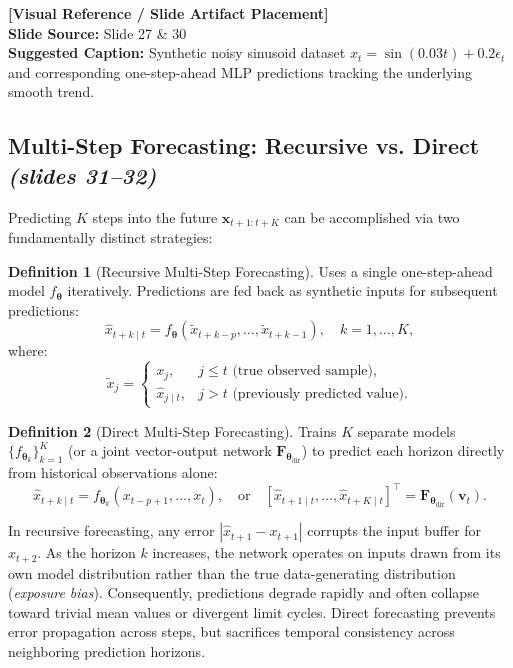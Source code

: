\documentclass[11pt,a4paper]{article}
\theoremstyle{definition}
\newtheorem{definition}{Definition}[section]
\theoremstyle{plain}
\newcommand{\slideimageplaceholder}[2]{
    \begin{center}
    \begin{tcolorbox}[
        enhanced,
        colback=gray!8!white,
        colframe=gray!60!black,
        width=0.92\textwidth,
        arc=2mm,
        frame hidden,
        borderline={0.5mm}{0mm}{gray!60!black, dashed},
        halign=center
    ]
        \vspace{0.4cm}
        \textbf{\textsf{[Visual Reference / Slide Artifact Placement]}} \\
        \vspace{0.2cm}
        \textsf{\textbf{Slide Source:} Slide #1} \\
        \textsf{\textbf{Suggested Caption:} #2}
        \vspace{0.4cm}
    \end{tcolorbox}
    \end{center}
}
\begin{document}
\slideimageplaceholder{27 \& 30}{Synthetic noisy sinusoid dataset $x_t = \sin(0.03t) + 0.2\epsilon_t$ and corresponding one-step-ahead MLP predictions tracking the underlying smooth trend.}

\subsection{Multi-Step Forecasting: Recursive vs. Direct \emph{(slides 31--32)}}
Predicting $K$ steps into the future $\mathbf{x}_{t+1:t+K}$ can be accomplished via two fundamentally distinct strategies:

\begin{definition}[Recursive Multi-Step Forecasting]
Uses a single one-step-ahead model $f_{\boldsymbol{\theta}}$ iteratively. Predictions are fed back as synthetic inputs for subsequent predictions:
\begin{equation}
    \hat{x}_{t+k \mid t} = f_{\boldsymbol{\theta}}(\tilde{x}_{t+k-p}, \dots, \tilde{x}_{t+k-1}), \quad k = 1, \dots, K,
\end{equation}
where:
\begin{equation}
    \tilde{x}_j = \begin{cases} x_j, & j \le t \text{ (true observed sample)}, \\ \hat{x}_{j \mid t}, & j > t \text{ (previously predicted value)}. \end{cases}
\end{equation}
\end{definition}

\begin{definition}[Direct Multi-Step Forecasting]
Trains $K$ separate models $\{f_{\boldsymbol{\theta}_k}\}_{k=1}^K$ (or a joint vector-output network $\mathbf{F}_{\boldsymbol{\theta}_{\text{dir}}}$) to predict each horizon directly from historical observations alone:
\begin{equation}
    \hat{x}_{t+k \mid t} = f_{\boldsymbol{\theta}_k}(x_{t-p+1}, \dots, x_t), \quad \text{or} \quad [\hat{x}_{t+1 \mid t}, \dots, \hat{x}_{t+K \mid t}]^\top = \mathbf{F}_{\boldsymbol{\theta}_{\text{dir}}}(\mathbf{v}_t).
\end{equation}
\end{definition}

\begin{intuitionbox}
In recursive forecasting, any error $|\hat{x}_{t+1} - x_{t+1}|$ corrupts the input buffer for $\hat{x}_{t+2}$. As the horizon $k$ increases, the network operates on inputs drawn from its own model distribution rather than the true data-generating distribution (\emph{exposure bias}). Consequently, predictions degrade rapidly and often collapse toward trivial mean values or divergent limit cycles. Direct forecasting prevents error propagation across steps, but sacrifices temporal consistency across neighboring prediction horizons.
\end{intuitionbox}
\end{document}
